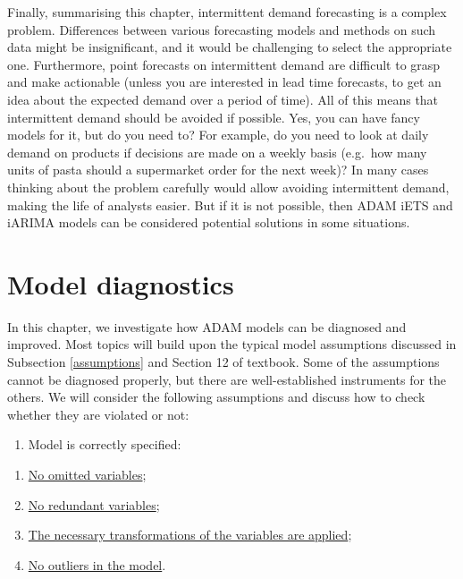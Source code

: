 \documentclass[
]{book}
\providecommand{\tightlist}{%
  \setlength{\itemsep}{0pt}\setlength{\parskip}{0pt}}
\theoremstyle{definition}
\theoremstyle{definition}
\theoremstyle{definition}
\theoremstyle{definition}
\theoremstyle{remark}
\begin{document}
Finally, summarising this chapter, intermittent demand forecasting is a complex problem. Differences between various forecasting models and methods on such data might be insignificant, and it would be challenging to select the appropriate one. Furthermore, point forecasts on intermittent demand are difficult to grasp and make actionable (unless you are interested in lead time forecasts, to get an idea about the expected demand over a period of time). All of this means that intermittent demand should be avoided if possible. Yes, you can have fancy models for it, but do you need to? For example, do you need to look at daily demand on products if decisions are made on a weekly basis (e.g.~how many units of pasta should a supermarket order for the next week)? In many cases thinking about the problem carefully would allow avoiding intermittent demand, making the life of analysts easier. But if it is not possible, then ADAM iETS and iARIMA models can be considered potential solutions in some situations.

\hypertarget{diagnostics}{%
\chapter{Model diagnostics}\label{diagnostics}}

In this chapter, we investigate how ADAM models can be diagnosed and improved. Most topics will build upon the typical model assumptions discussed in Subsection \ref{assumptions} and Section 12 of \citet{SvetunkovSBA} textbook. Some of the assumptions cannot be diagnosed properly, but there are well-established instruments for the others. We will consider the following assumptions and discuss how to check whether they are violated or not:

\begin{enumerate}
\def\labelenumi{\arabic{enumi}.}
\tightlist
\item
  Model is correctly specified:
\end{enumerate}

\begin{enumerate}
\def\labelenumi{\alph{enumi}.}
\tightlist
\item
  \protect\hyperlink{diagnosticsOmitted}{No omitted variables};
\item
  \protect\hyperlink{diagnosticsRedundant}{No redundant variables};
\item
  \protect\hyperlink{diagnosticsTransformations}{The necessary transformations of the variables are applied};
\item
  \protect\hyperlink{diagnosticsOutliers}{No outliers in the model}.
\end{enumerate}
\end{document}
